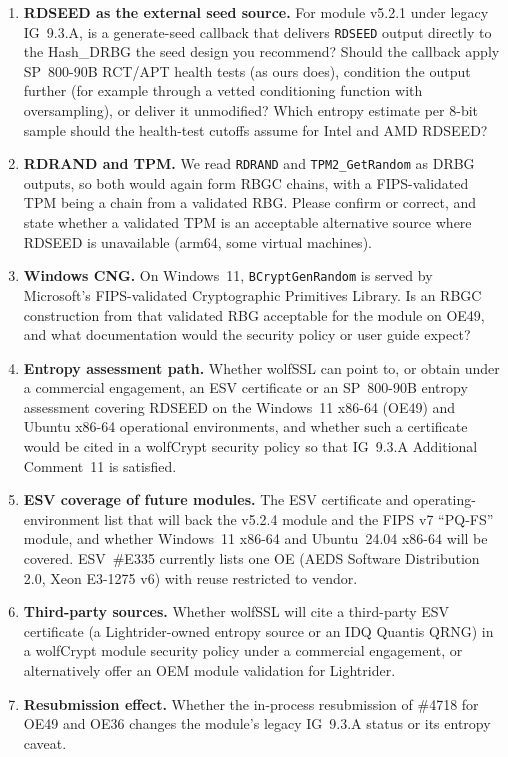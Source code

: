 \documentclass[10pt]{article}
\newcommand{\code}[1]{\texttt{\small #1}}
\begin{document}
\begin{enumerate}
  \item \textbf{RDSEED as the external seed source.} For module v5.2.1
        under legacy IG~9.3.A, is a generate-seed callback that delivers
        \code{RDSEED} output directly to the Hash\_DRBG the seed design you
        recommend? Should the callback apply SP~800-90B RCT/APT health tests
        (as ours does), condition the output further (for example through a
        vetted conditioning function with oversampling), or deliver it
        unmodified? Which entropy estimate per 8-bit sample should the
        health-test cutoffs assume for Intel and AMD RDSEED?
  \item \textbf{RDRAND and TPM.} We read \code{RDRAND} and
        \code{TPM2\_GetRandom} as DRBG outputs, so both would again form
        RBGC chains, with a FIPS-validated TPM being a chain from a validated
        RBG. Please confirm or correct, and state whether a validated TPM is
        an acceptable alternative source where RDSEED is unavailable (arm64,
        some virtual machines).
  \item \textbf{Windows CNG.} On Windows~11, \code{BCryptGenRandom} is
        served by Microsoft's FIPS-validated Cryptographic Primitives
        Library. Is an RBGC construction from that validated RBG acceptable
        for the module on OE49, and what documentation would the security
        policy or user guide expect?
  \item \textbf{Entropy assessment path.} Whether wolfSSL can point to, or
        obtain under a commercial engagement, an ESV certificate or an
        SP~800-90B entropy assessment covering RDSEED on the Windows~11 x86-64
        (OE49) and Ubuntu x86-64 operational environments, and whether such a
        certificate would be cited in a wolfCrypt security policy so that
        IG~9.3.A Additional Comment~11 is satisfied.
  \item \textbf{ESV coverage of future modules.} The ESV certificate and
        operating-environment list that will back the v5.2.4 module and the
        FIPS v7 ``PQ-FS'' module, and whether Windows~11 x86-64 and
        Ubuntu~24.04 x86-64 will be covered. ESV~\#E335 currently lists one
        OE (AEDS Software Distribution 2.0, Xeon E3-1275 v6) with reuse
        restricted to vendor.
  \item \textbf{Third-party sources.} Whether wolfSSL will cite a
        third-party ESV certificate (a Lightrider-owned entropy source or an
        IDQ Quantis QRNG) in a wolfCrypt module security policy under a
        commercial engagement, or alternatively offer an OEM module
        validation for Lightrider.
  \item \textbf{Resubmission effect.} Whether the in-process resubmission of
        \#4718 for OE49 and OE36 changes the module's legacy IG~9.3.A status
        or its entropy caveat.
\end{enumerate}
\end{document}
